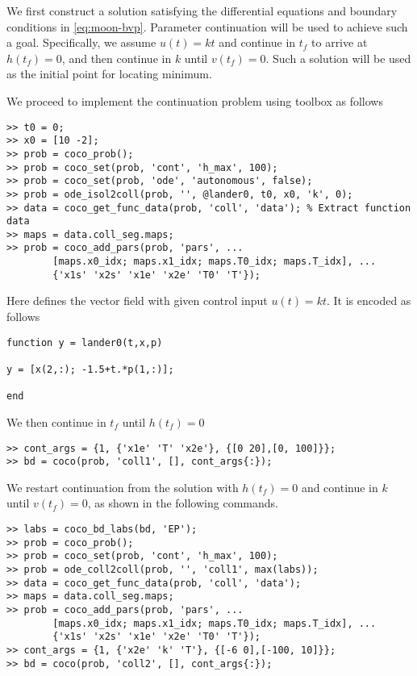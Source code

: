 We first construct a solution satisfying the differential equations and boundary conditions in \eqref{eq:moon-bvp}. Parameter continuation will be used to achieve such a goal. Specifically, we assume $u(t)=kt$ and continue in $t_f$ to arrive at $h(t_f)=0$, and then continue in $k$ until $v(t_f)=0$. Such a solution will be used as the initial point for locating minimum.

We proceed to implement the continuation problem using  toolbox as follows
\begin{lstlisting}[language=coco-highlight]
>> t0 = 0;
>> x0 = [10 -2];
>> prob = coco_prob();
>> prob = coco_set(prob, 'cont', 'h_max', 100);
>> prob = coco_set(prob, 'ode', 'autonomous', false);
>> prob = ode_isol2coll(prob, '', @lander0, t0, x0, 'k', 0);
>> data = coco_get_func_data(prob, 'coll', 'data'); % Extract function data
>> maps = data.coll_seg.maps;
>> prob = coco_add_pars(prob, 'pars', ...
  		[maps.x0_idx; maps.x1_idx; maps.T0_idx; maps.T_idx], ...
  		{'x1s' 'x2s' 'x1e' 'x2e' 'T0' 'T'});
\end{lstlisting}
Here  defines the vector field with given control input $u(t)=kt$. It is encoded as follows
\begin{lstlisting}[language=coco-highlight]
function y = lander0(t,x,p)

y = [x(2,:); -1.5+t.*p(1,:)];

end
\end{lstlisting}
We then continue in $t_f$ until $h(t_f)=0$
\begin{lstlisting}[language=coco-highlight]
>> cont_args = {1, {'x1e' 'T' 'x2e'}, {[0 20],[0, 100]}};
>> bd = coco(prob, 'coll1', [], cont_args{:});
\end{lstlisting}

We restart continuation from the solution with $h(t_f)=0$ and continue in $k$ until $v(t_f)=0$, as shown in the following commands.
\begin{lstlisting}[language=coco-highlight]
>> labs = coco_bd_labs(bd, 'EP');
>> prob = coco_prob();
>> prob = coco_set(prob, 'cont', 'h_max', 100);
>> prob = ode_coll2coll(prob, '', 'coll1', max(labs));
>> data = coco_get_func_data(prob, 'coll', 'data');
>> maps = data.coll_seg.maps;
>> prob = coco_add_pars(prob, 'pars', ...
        [maps.x0_idx; maps.x1_idx; maps.T0_idx; maps.T_idx], ...
        {'x1s' 'x2s' 'x1e' 'x2e' 'T0' 'T'});
>> cont_args = {1, {'x2e' 'k' 'T'}, {[-6 0],[-100, 10]}};
>> bd = coco(prob, 'coll2', [], cont_args{:});
\end{lstlisting}

